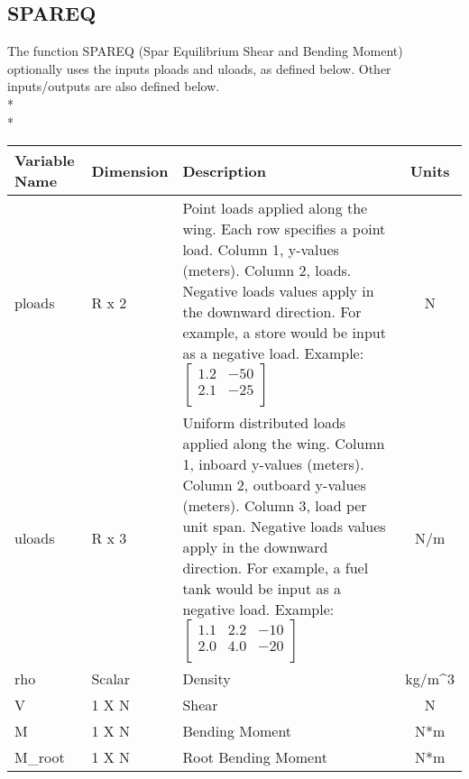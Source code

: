 \documentclass{article}
\begin{document}
\subsection{SPAREQ}
The function SPAREQ (Spar Equilibrium Shear and Bending Moment)
optionally uses the inputs ploads and uloads, as defined below.  Other
inputs/outputs are also defined below.\\*\\*
\begin{tabular}{|l|l|p{3.5in}|c|}
  \hline
  \textbf{Variable Name} &
  \textbf{Dimension} &
  \textbf{Description} &
  \textbf{Units}
  \\
  \hline
  ploads & R x 2 &
  Point loads applied along the wing.  Each row specifies a point
  load.  Column 1, y-values (meters).  Column 2, loads.  Negative
  loads values apply in the downward direction.  For example, a store
  would be input as a negative load.  Example:
  $\begin{bmatrix}1.2&-50\\2.1&-25\\\end{bmatrix}$ &
  N
  \\
  \hline
  uloads & R x 3 &
  Uniform distributed loads applied along the wing.  Column 1, inboard
  y-values (meters).  Column 2, outboard y-values (meters).  Column 3,
  load per unit span.  Negative loads values apply in the downward
  direction.  For example, a fuel tank would be input as a negative
  load.  Example:
  $\begin{bmatrix}1.1&2.2&-10\\2.0&4.0&-20\\\end{bmatrix}$ &
  N/m
  \\
  \hline
  rho & Scalar &
  Density &
  kg/m\^{}3
  \\
  \hline
  V & 1 X N &
  Shear &
  N
  \\
  \hline
  M & 1 X N &
  Bending Moment &
  N*m
  \\
  \hline
  M\_root & 1 X N &
  Root Bending Moment &
  N*m
  \\
  \hline
\end{tabular}
\end{document}
